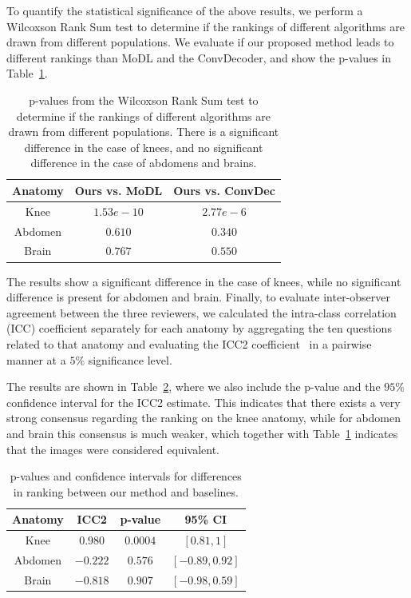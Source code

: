 To quantify the statistical significance of the above results, we perform a Wilcoxson Rank Sum test to determine if the rankings of different algorithms are drawn from different populations. We evaluate if our proposed method leads to different rankings than MoDL and the ConvDecoder, and show the p-values in Table~\ref{tab:radiologist-pval}.
\begin{table}
    \centering
    \begin{tabular}{|c|c|c|}
    \hline
    Anatomy & Ours vs. MoDL	& Ours vs. ConvDec \\
    \hline
    Knee	& $1.53e-10$ & $2.77e-6$ \\
    Abdomen	& $0.610$	& $0.340$ \\
    Brain	& $0.767$	& $0.550$ \\
    \hline
    \end{tabular}
    \caption{p-values from the Wilcoxson Rank Sum test to determine if the rankings of different algorithms are drawn from different populations. There is a significant difference in the case of knees, and no significant difference in the case of abdomens and brains.}
    \label{tab:radiologist-pval}
\end{table}

The results show a significant difference in the case of knees, while no significant difference is present for abdomen and brain. Finally, to evaluate inter-observer agreement between the three reviewers, we calculated the intra-class correlation (ICC) coefficient separately for each anatomy by aggregating the ten questions related to that anatomy and evaluating the ICC2 coefficient~\cite{pingouin-stats} in a pairwise manner at a $5\%$ significance level.

The results are shown in Table~\ref{tab:radiologist-icc2}, where we also include the p-value and the $95\%$ confidence interval for the ICC2 estimate. This indicates that there exists a very strong consensus regarding the ranking on the knee anatomy, while for abdomen and brain this consensus is much weaker, which together with Table~\ref{tab:radiologist-pval} indicates that the images were considered equivalent.
\begin{table}
    \centering
    \begin{tabular}{|c|c|c|c|}
    \hline
    Anatomy & ICC2	& p-value & 95\% CI \\
    \hline
    Knee	& $0.980$  & $0.0004$ & $[0.81, 1]$ \\
    Abdomen	& $-0.222$ & $0.576$  & $[-0.89, 0.92]$ \\
    Brain	& $-0.818$ & $0.907$  & $[-0.98, 0.59]$ \\
    \hline
    \end{tabular}
    \caption{p-values and confidence intervals for differences in ranking between our method and baselines.}
    \label{tab:radiologist-icc2}
\end{table}

